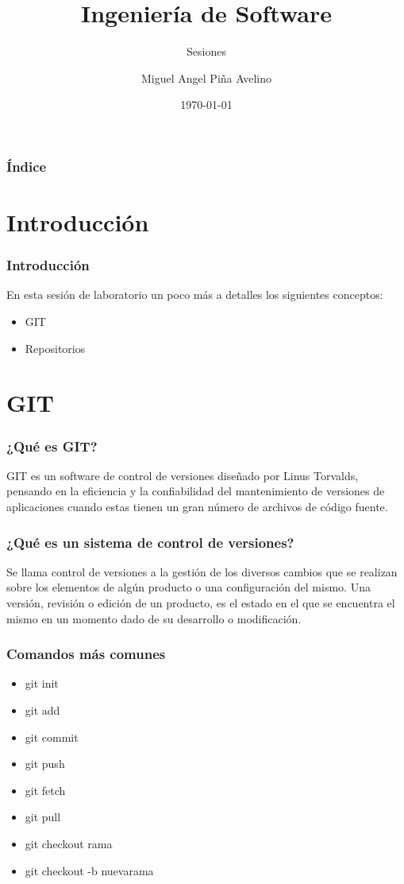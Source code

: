 \documentclass{beamer}
\title[UNAM]{Ingeniería de Software}
\subtitle{Sesiones}
\author[Miguel]{Miguel Angel Piña Avelino}
\institute[UNAM]{
  Facultad de ciencias, UNAM
}
\date{\today}
\begin{document}
\frame{\titlepage}

\begin{frame}
  \frametitle{Índice}
  \tableofcontents
\end{frame}

\section{Introducción}
\begin{frame}
  \frametitle{Introducción}
  En esta sesión de laboratorio un poco más a detalles los siguientes conceptos:
  \begin{itemize}
    \item GIT
    \item Repositorios
  \end{itemize}
\end{frame}
\section{GIT}

\begin{frame}
  \frametitle{¿Qué es GIT?}
  GIT es un software de control de versiones diseñado por Linus Torvalds, pensando en la eficiencia y la confiabilidad del mantenimiento de versiones de aplicaciones cuando estas tienen un gran número de archivos de código fuente.
\end{frame}

\begin{frame}
  \frametitle{¿Qué es un sistema de control de versiones?}
  Se llama control de versiones a la gestión de los diversos cambios que se realizan sobre los elementos de algún producto o una configuración del mismo. Una versión, revisión o edición de un producto, es el estado en el que se encuentra el mismo en un momento dado de su desarrollo o modificación.
\end{frame}

\begin{frame}
  \frametitle{Comandos más comunes}
  \begin{itemize}
    \item git init
    \item git add
    \item git commit
    \item git push
    \item git fetch
    \item git pull
    \item git checkout rama
    \item git checkout -b nuevarama
  \end{itemize}
\end{frame}
\end{document}
